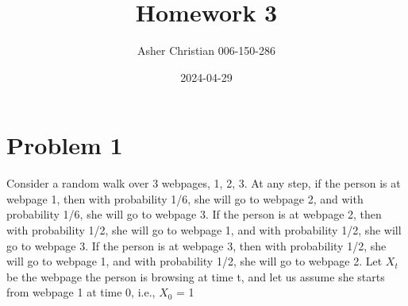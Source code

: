 \documentclass{article}
\title{Homework 3}
\author{Asher Christian 006-150-286}
\date{2024-04-29}
\begin{document}
    \maketitle
    \section{Problem 1}
        Consider a random walk over 3 webpages, 1, 2, 3. At any step, if the person is at
    webpage 1, then with probability 1/6, she will go to webpage 2, and with probability 1/6, she will
    go to webpage 3. If the person is at webpage 2, then with probability 1/2, she will go to webpage
    1, and with probability 1/2, she will go to webpage 3. If the person is at webpage 3, then with
    probability 1/2, she will go to webpage 1, and with probability 1/2, she will go to webpage 2.
    Let $X_t$ be the webpage the person is browsing at time t, and let us assume she starts from
    webpage 1 at time 0, i.e., $X_0$ = 1
\end{document}
